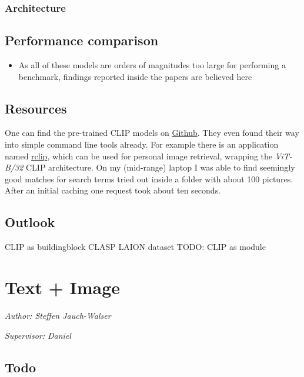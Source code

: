 \documentclass[
]{krantz}
\providecommand{\tightlist}{%
  \setlength{\itemsep}{0pt}\setlength{\parskip}{0pt}}
\begin{document}
\hypertarget{architecture-1}{%
\subsubsection{Architecture}\label{architecture-1}}

\hypertarget{performance-comparison}{%
\subsection{Performance comparison}\label{performance-comparison}}

\begin{itemize}
\tightlist
\item
  As all of these models are orders of magnitudes too large for performing a benchmark, findings reported inside the papers are believed here
\end{itemize}

\hypertarget{resources}{%
\subsection{Resources}\label{resources}}

One can find the pre-trained CLIP models on \href{https://github.com/openai/CLIP}{Github}.
They even found their way into simple command line tools already.
For example there is an application named \href{https://github.com/yurijmikhalevich/rclip}{rclip}, which can be used for personal image retrieval, wrapping the \emph{ViT-B/32} CLIP architecture.
On my (mid-range) laptop I was able to find seemingly good matches for search terms tried out inside a folder with about 100 pictures.
After an initial caching one request took about ten seconds.

\hypertarget{outlook}{%
\subsection{Outlook}\label{outlook}}

CLIP as buildingblock
CLASP
LAION dataset
TODO: CLIP as module

\hypertarget{text-image}{%
\section{Text + Image}\label{text-image}}

\emph{Author: Steffen Jauch-Walser }

\emph{Supervisor: Daniel }

\hypertarget{todo}{%
\subsection{Todo}\label{todo}}
\end{document}
